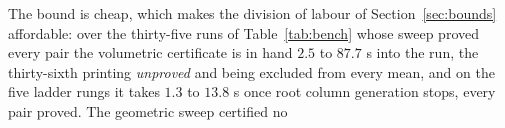 The bound is cheap, which makes the division of labour of
Section~\ref{sec:bounds} affordable: over the thirty-five runs of
Table~\ref{tab:bench} whose sweep proved every pair the volumetric
certificate is in hand $2.5$ to $87.7$ s into the run, the thirty-sixth
printing \emph{unproved} and being excluded from every mean, and on
the five ladder rungs it takes $1.3$ to $13.8$ s once root column
generation stops, every pair proved. The geometric sweep certified no
